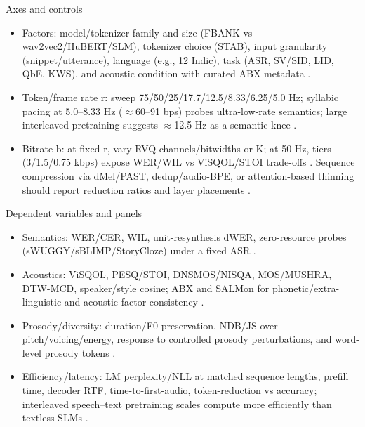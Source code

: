 \documentclass{article}
\begin{document}
Axes and controls
\begin{itemize}
  \item Factors: model/tokenizer family and size (FBANK vs wav2vec2/HuBERT/SLM), tokenizer choice (STAB), input granularity (snippet/utterance), language (e.g., 12 Indic), task (ASR, SV/SID, LID, QbE, KWS), and acoustic condition with curated ABX metadata \cite{poli2025fastabxlibraryefficientcomputationabxdis,vashishth2024stabspeechtokenizerassessmentbenchmark,fily2024establishingdegreesclosenessbetweenaudio,entry2025indicsuperbspeechprocessinguniversalperf,tian2025espnetspeechlmopenspeechlanguagemodeltoo}.
  \item Token/frame rate r: sweep 75/50/25/17.7/12.5/8.33/6.25/5.0 Hz; syllabic pacing at 5.0--8.33 Hz ($\approx$60--91 bps) probes ultra-low-rate semantics; large interleaved pretraining suggests $\approx$12.5 Hz as a semantic knee \cite{baade2024syllablelmlearningcoarsesemanticunitsspe,zeng2024scalingspeechtextpretrainingsyntheticint}.
  \item Bitrate b: at fixed r, vary RVQ channels/bitwidths or K; at 50 Hz, tiers (3/1.5/0.75 kbps) expose WER/WIL vs ViSQOL/STOI trade-offs \cite{li2024investigatingneuralaudiocodecsspeechlang,ahasan2025dmcodecdistillingmultimodalrepresentatio}. Sequence compression via dMel/PAST, dedup/audio-BPE, or attention-based thinning should report reduction ratios and layer placements \cite{bai2025dmelspeechtokenizationmadesimple,har-tuv2025pastphoneticacousticspeechtokenizer,min2025speechretrievalaugmentedgenerationwithou}.
\end{itemize}

Dependent variables and panels
\begin{itemize}
  \item Semantics: WER/CER, WIL, unit-resynthesis dWER, zero-resource probes (sWUGGY/sBLIMP/StoryCloze) under a fixed ASR \cite{li2024investigatingneuralaudiocodecsspeechlang}.
  \item Acoustics: ViSQOL, PESQ/STOI, DNSMOS/NISQA, MOS/MUSHRA, DTW-MCD, speaker/style cosine; ABX and SALMon for phonetic/extra-linguistic and acoustic-factor consistency \cite{fily2024establishingdegreesclosenessbetweenaudio,maimon2025salmonsuiteacousticlanguagemodelevaluati,poli2025fastabxlibraryefficientcomputationabxdis}.
  \item Prosody/diversity: duration/F0 preservation, NDB/JS over pitch/voicing/energy, response to controlled prosody perturbations, and word-level prosody tokens \cite{qian2025prosodylmuncoveringemergingprosodyproces,onda2025benchmarkingprosodyencodingdiscretespeec}.
  \item Efficiency/latency: LM perplexity/NLL at matched sequence lengths, prefill time, decoder RTF, time-to-first-audio, token-reduction vs accuracy; interleaved speech--text pretraining scales compute more efficiently than textless SLMs \cite{maimon2025scalinganalysisinterleavedspeechtextlang,ma2025efficientspeechlanguagemodelingenergydis,vashishth2024stabspeechtokenizerassessmentbenchmark}.
\end{itemize}
\end{document}
